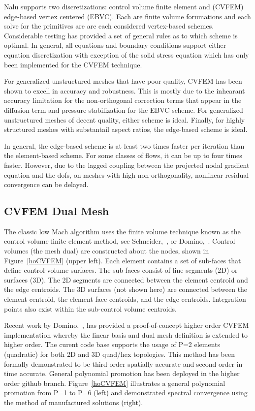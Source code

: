 Nalu supports two discretizations: control volume finite element
and (CVFEM) edge-based vertex centered (EBVC). Each are finite volume forumations
and each solve for the primitives are are each considered vertex-based
schemes. Considerable testing has provided a set of general rules as to which
scheme is optimal. In general, all equations and boundary conditions
support either equation discretization with exception of the solid stress equation
which has only been implemented for the CVFEM technique.

For generalized unstructured meshes that have poor quality,
CVFEM has been shown to excell in accuracy and robustness. This is mostly
due to the inhearant accuracy limitation for the non-orthogonal
correction terms that appear in the diffusion term and pressure
stabilization for the EBVC scheme. For generalized unstructured meshes of decent quality, either 
scheme is ideal. Finally, for highly structured meshes with substantail aspect 
ratios, the edge-based scheme is ideal.

In general, the edge-based scheme is at least two times faster per iteration 
than the element-based scheme. For some classes of flows, it can be up
to four times faster. However, due to the lagged coupling between the projected
nodal gradient equation and the dofs, on meshes with high non-orthogonality,
nonlinear residual convergence can be delayed.

\subsection{CVFEM Dual Mesh}

The classic low Mach algorithm uses the finite volume technique known
as the control volume finite element method, see Schneider,~\cite{Schneider:1987}, or 
Domino,~\cite{Domino:2006}. Control volumes 
(the mesh dual) are constructed about the nodes, shown in Figure~\ref{hoCVFEM} (upper left).
Each element contains a set of sub-faces that define control-volume surfaces.
The sub-faces consist of line segments (2D) or surfaces (3D).
The 2D segments are connected between the element centroid
and the edge centroids. The 3D surfaces (not shown here) are connected between
the element centroid, the element face centroids, and the
edge centroids. Integration points also exist within the sub-control
volume centroids. 

Recent work by Domino,~\cite{Domino:2014}, has provided a proof-of-concept higher order CVFEM implementation 
whereby the linear basis and dual mesh definition is extended to higher order. The curent code base supports
the usage of P=2 elements (quadratic) for both 2D and 3D quad/hex topologies. This method has been formally 
demonstrated to be third-order spatially accurate and second-order in-time accurate. General polynomial promotion
has been deployed in the higher order github branch. Figure~\ref{hoCVFEM} illustrates a general polynomial promotion
from P=1 to P=6 (left) and demonstrated spectral convergence using the method of manufactured solutions (right).

